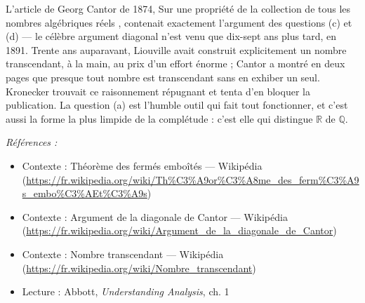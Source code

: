 \documentclass[11pt]{article}
\newenvironment{refs}{\par\small\noindent\emph{Références :}\begin{itemize}\setlength\itemsep{0pt}}{\end{itemize}\normalsize}
\begin{document}
\noindent L'article de Georg Cantor de 1874, \og{} Sur une propriété de la collection de tous
les nombres algébriques réels \fg{}, contenait exactement l'argument des questions (c) et (d) --- le
célèbre argument diagonal n'est venu que dix-sept ans plus tard, en 1891. Trente ans auparavant,
Liouville avait construit explicitement un nombre transcendant, à la main, au prix d'un effort
énorme ; Cantor a montré en deux pages que presque tout nombre est transcendant sans en exhiber un
seul. Kronecker trouvait ce raisonnement répugnant et tenta d'en bloquer la publication. La question
(a) est l'humble outil qui fait tout fonctionner, et c'est aussi la forme la plus limpide de la
complétude : c'est elle qui distingue $ \mathbb{R} $ de $ \mathbb{Q} $.

\begin{refs}
\item Contexte : Théorème des fermés emboîtés --- Wikipédia (\url{https://fr.wikipedia.org/wiki/Th%C3%A9or%C3%A8me_des_ferm%C3%A9s_embo%C3%AEt%C3%A9s})
\item Contexte : Argument de la diagonale de Cantor --- Wikipédia (\url{https://fr.wikipedia.org/wiki/Argument_de_la_diagonale_de_Cantor})
\item Contexte : Nombre transcendant --- Wikipédia (\url{https://fr.wikipedia.org/wiki/Nombre_transcendant})
\item Lecture : Abbott, \textit{Understanding Analysis}, ch. 1
\end{refs}

\bigskip
\end{document}
